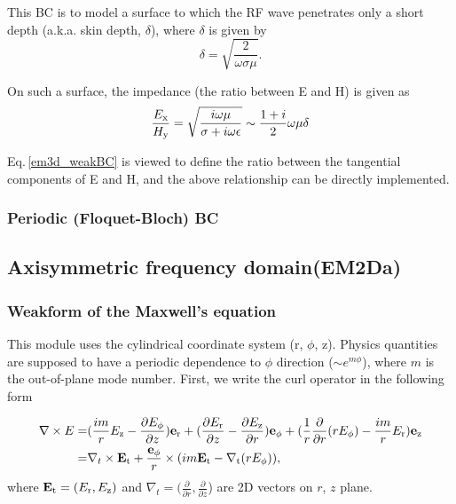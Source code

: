 \documentclass[11pt,a4paper,final]{report}
\begin{document}
This BC is to model a surface to which the RF wave penetrates only a short depth (a.k.a. skin depth, $\delta$), where $\delta$ is given by 
\begin{equation} 
\delta = \sqrt{\frac{2}{\omega \sigma \mu}}.
\end{equation}

On such a surface, the impedance (the ratio between E and H) is given as
\begin{equation}
\frac{E_{\rm x}}{H_{\rm y}} = \sqrt{\frac{i \omega \mu}{\sigma + i \omega \epsilon}} \sim \frac{1+i}{2} \omega \mu \delta
\end{equation}

Eq.\,\ref{em3d_weakBC} is viewed to define  the ratio between the tangential components of E and H, and the above relationship can be directly implemented.

 
 \subsubsection{Periodic (Floquet-Bloch) BC}
 
 
\subsection{Axisymmetric frequency domain(EM2Da)}
\subsubsection{Weakform of the Maxwell's equation}
This module uses the cylindrical coordinate system (r,  $\phi$, z). Physics quantities are supposed to have a periodic dependence to 
$\phi$ direction ($\sim e^{m \phi}$), where $m$ is the out-of-plane mode number. First, we write the curl operator in the following form

 \begin{align}
 \nabla \times E = &(\frac{im}{r} E_{\rm z} - \frac{\partial E_{\phi}}{\partial z})\mathbf{e}_{\rm r} +
( \frac{\partial E_{\rm r}}{\partial z} - \frac{\partial E_{\rm z}}{\partial r})\mathbf{e}_{\rm \phi}+
 (\frac{1}{r}\frac{\partial }{\partial r}(r E_{\phi}) - \frac{im}{r} E_{\rm r} )\mathbf{e}_{\rm z} 
 \notag \\ 
 = &\nabla_{t} \times \mathbf{E}_{\rm t} + \frac{\mathbf{e}_{\rm \phi}}{r} \times (im \mathbf{E}_{\rm t} - \nabla_{\rm t} (rE_{\rm \phi}) ),
 \end{align}
 where $\mathbf{E}_{\rm t} = (E_{\rm r}, E_{\rm z})$ and  $\nabla_{t} = (\frac{\partial }{\partial r}, \frac{\partial }{\partial z}$) are 2D vectors on $r$, $z$ plane.
 
\end{document}
